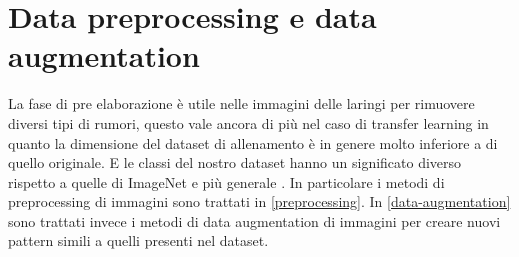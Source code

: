 \section{Data preprocessing e data augmentation}\label{data-pre-processing-e-augmentation-processing}

La fase di pre elaborazione è utile nelle immagini delle laringi per rimuovere diversi tipi di rumori, questo vale ancora di più nel caso di transfer learning in quanto la dimensione del dataset di allenamento è in genere molto inferiore a di quello originale. E le classi del nostro dataset hanno un significato diverso rispetto a quelle di ImageNet e più generale \cite{joel_tl}. In particolare i metodi di preprocessing di immagini sono trattati in \cref{preprocessing}. In \cref{data-augmentation} sono trattati invece i metodi di data augmentation di immagini per creare nuovi pattern simili a quelli presenti nel dataset.





